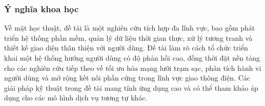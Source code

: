 \subsubsection{Ý nghĩa khoa học}
    Về mặt học thuật, đề tài là một nghiên cứu tích hợp đa lĩnh vực, bao gồm phát triển hệ thống phần mềm, quản lý dữ liệu thời gian thực, xử lý tương tranh và thiết kế giao diện thân thiện với người dùng. Đề tài làm rõ cách tổ chức triển khai một hệ thống hướng người dùng có độ phản hồi cao, đồng thời đặt nền tảng cho các nghiên cứu tiếp theo về tối ưu hóa mạng lưới trạm sạc, phân tích hành vi người dùng và mở rộng kết nối phần cứng trong lĩnh vực giao thông điện. Các giải pháp kỹ thuật trong đề tài mang tính ứng dụng cao và có thể tham khảo áp dụng cho các mô hình dịch vụ tương tự khác.


